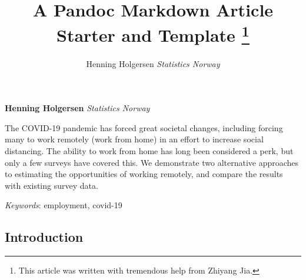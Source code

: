 \documentclass[11pt,]{article}
\title{A Pandoc Markdown Article Starter and Template \thanks{This article was written with tremendous help from Zhiyang Jia.}  }
\author{\Large Henning Holgersen\vspace{0.05in} \newline\normalsize\emph{Statistics Norway}  }
\date{}
\newcommand*{\authorfont}{\fontfamily{phv}\selectfont}
\renewenvironment{abstract}
 {{%
    \setlength{\leftmargin}{0mm}
    \setlength{\rightmargin}{\leftmargin}%
  }%
  \relax}
 {\endlist}
\begin{document}
	
%

{%
\setlength{\parindent}{0pt}
\thispagestyle{plain}
{\fontsize{18}{20}\selectfont\raggedright 
\maketitle  %

}

{
   \vskip 13.5pt\relax \normalsize\fontsize{11}{12} 
\textbf{\authorfont Henning Holgersen} \hskip 15pt \emph{\small Statistics Norway}   

}

}








\begin{abstract}

    \hbox{\vrule height .2pt width 39.14pc}

    \vskip 8.5pt %

\noindent The COVID-19 pandemic has forced great societal changes, including
forcing many to work remotely (work from home) in an effort to increase
social distancing. The ability to work from home has long been
considered a perk, but only a few surveys have covered this. We
demonstrate two alternative approaches to estimating the opportunities
of working remotely, and compare the results with existing survey data.


\vskip 8.5pt \noindent \emph{Keywords}: employment, covid-19 \par

    \hbox{\vrule height .2pt width 39.14pc}



\end{abstract}


\vskip -8.5pt



\noindent  

\hypertarget{introduction}{%
\subsection{Introduction}\label{introduction}}
\end{document}
